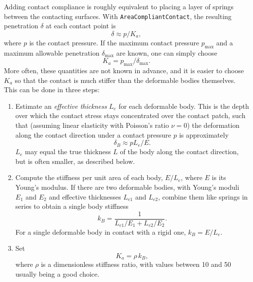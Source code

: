 Adding contact compliance is roughly equivalent to placing a layer of
springs between the contacting surfaces. With {\tt AreaCompliantContact},
the resulting penetration $\delta$ at each contact point is
%
\begin{equation*}
\delta \approx p/K_a,
\end{equation*}
%
where $p$ is the contact pressure. If the maximum contact pressure
$p_{\text{max}}$ and a maximum allowable penetration $\delta_{\text{max}}$
are known, one can simply choose
%
\begin{equation}
\boxed{K_a = p_{\text{max}}/\delta_{\text{max}}.}
\label{KaFromPmax:eqn}
\end{equation}
%
More often, these quantities are not known in advance, and it is easier to
choose $K_a$ so that the contact is much stiffer than the deformable
bodies themselves. This can be done in three steps:

\begin{enumerate}

\item Estimate an {\it effective thickness} $L_e$ for each deformable body.
This is the depth over which the
contact stress stays concentrated over the contact patch, such that
(assuming linear elasticity with Poisson's ratio $\nu=0$) the deformation
along the contact direction under a contact pressure $p$ is
approximately
%
\begin{equation*}
\delta_B \approx p L_e / E.
\end{equation*}
%
$L_e$ may equal the true thickness $L$ of the body along the contact
direction, but is often smaller, as described below.

\item Compute the stiffness per unit area of each body, $E/L_e$, where $E$
is its Young's modulus. If there are two deformable bodies, with Young's
moduli $E_1$ and $E_2$ and effective thicknesses $L_{e1}$ and $L_{e2}$,
combine them like springs in series to obtain a single body stiffness
%
\begin{equation*}
k_B = \frac{1}{L_{e1}/E_1 + L_{e2}/E_2}.
\end{equation*}
%
For a single deformable body in contact with a rigid one, $k_B = E/L_e$.

\item Set
%
\begin{equation}
\boxed{K_a = \rho \, k_B,}
\label{KaFromE:eqn}
\end{equation}
%
where $\rho$ is a dimensionless stiffness ratio, with values between
10 and 50 usually being a good choice.

\end{enumerate}


